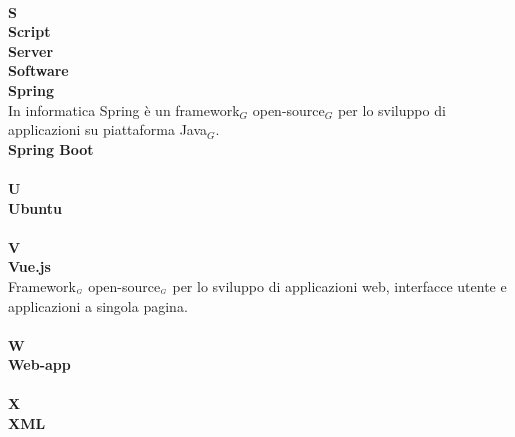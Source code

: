 \\
\textbf{S}
\\
\textbf{Script}\\
\textbf{Server}\\
\textbf{Software}\\
\textbf{Spring}\\
In informatica Spring è un framework$_G$ open-source$_G$ per lo sviluppo di applicazioni su piattaforma Java$_G$.\\
\textbf{Spring Boot}\\
\\
\textbf{U}
\\
\textbf{Ubuntu}\\
\\
\textbf{V}
\\
\textbf{Vue.js}\\
Framework$_{\scaleto{G}{3pt}}$ open-source$_{\scaleto{G}{3pt}}$ per lo sviluppo di applicazioni web, interfacce utente e applicazioni a singola pagina.\\
\\
\textbf{W}
\\
\textbf{Web-app}\\
\\
\textbf{X}
\\
\textbf{XML}\\
\\